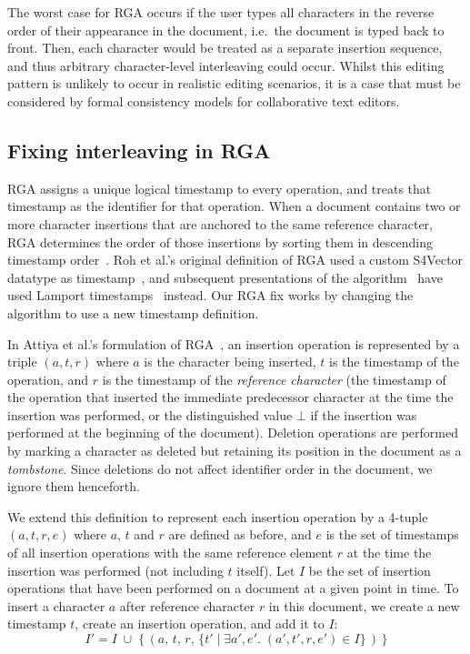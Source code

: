 \documentclass[sigconf]{acmart}
\begin{document}
The worst case for RGA occurs if the user types all characters in the reverse order of their appearance in the document, i.e.\ the document is typed back to front.
Then, each character would be treated as a separate insertion sequence, and thus arbitrary character-level interleaving could occur.
Whilst this editing pattern is unlikely to occur in realistic editing scenarios, it is a case that must be considered by formal consistency models for collaborative text editors.

\subsection{Fixing interleaving in RGA}\label{sec:fixing-rga}

RGA assigns a unique logical timestamp to every operation, and treats that timestamp as the identifier for that operation.
When a document contains two or more character insertions that are anchored to the same reference character, RGA determines the order of those insertions by sorting them in descending timestamp order~\cite{Attiya:2016kh,Gomes:2017gy}.
Roh et al.'s original definition of RGA used a custom S4Vector datatype as timestamp~\cite{Roh:2011dw}, and subsequent presentations of the algorithm~\cite{Shapiro:2011wy} have used Lamport timestamps~\cite{Lamport:1978jq} instead.
Our RGA fix works by changing the algorithm to use a new timestamp definition.

In Attiya et al.'s formulation of RGA~\cite{Attiya:2016kh}, an insertion operation is represented by a triple $(a, t, r)$ where $a$ is the character being inserted, $t$ is the timestamp of the operation, and $r$ is the timestamp of the \emph{reference character} (the timestamp of the operation that inserted the immediate predecessor character at the time the insertion was performed, or the distinguished value $\bot$ if the insertion was performed at the beginning of the document).
Deletion operations are performed by marking a character as deleted but retaining its position in the document as a \emph{tombstone}.
Since deletions do not affect identifier order in the document, we ignore them henceforth.

We extend this definition to represent each insertion operation by a 4-tuple $(a, t, r, e)$ where $a$, $t$ and $r$ are defined as before, and $e$ is the set of timestamps of all insertion operations with the same reference element $r$ at the time the insertion was performed (not including $t$ itself).
Let $I$ be the set of insertion operations that have been performed on a document at a given point in time.
To insert a character $a$ after reference character $r$ in this document, we create a new timestamp $t$, create an insertion operation, and add it to $I$:
\[ I' = I \;\cup\; \big\{\,(a,\, t,\, r,\, \{t' \mid \exists a', e'.\; (a', t', r, e') \in I \}\,)\,\big\} \]
\end{document}
